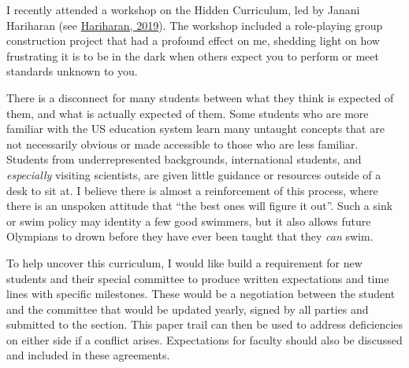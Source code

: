 \documentclass[11pt]{article}
\newcommand{\amy}[1]{{\color{amyCol} [\textbf{Amy:} #1]}}
\begin{document}


I recently attended a workshop on the Hidden Curriculum, led by Janani Hariharan (see \href{https://science.sciencemag.org/content/364/6441/702.full}{Hariharan, 2019}). The workshop included a role-playing group construction project that had a profound effect on me, shedding light on how frustrating it is to be in the dark when others expect you to perform or meet standards unknown to you. 

There is a disconnect for many students between what they think is expected of them, and what is actually expected of them. Some students who are more familiar with the US education system learn many untaught concepts that are not necessarily obvious or made accessible to those who are less familiar. Students from underrepresented backgrounds, international students, and \emph{especially} visiting scientists, are given little guidance or resources outside of a desk to sit at. I believe there is almost a reinforcement of this process, where there is an unspoken attitude that ``the best ones will figure it out''. Such a sink or swim policy may identity a few good swimmers, but it also allows future Olympians to drown before they have ever been taught that they \emph{can} swim. %




To help uncover this curriculum, I would like build a requirement for new students and their special committee to produce written expectations and time lines with specific milestones. These would be a negotiation between the student and the committee that would be updated yearly, signed by all parties and submitted to the section. This paper trail can then be used to address deficiencies on either side if a conflict arises. Expectations for faculty should also be discussed and included in these agreements.
\end{document}
